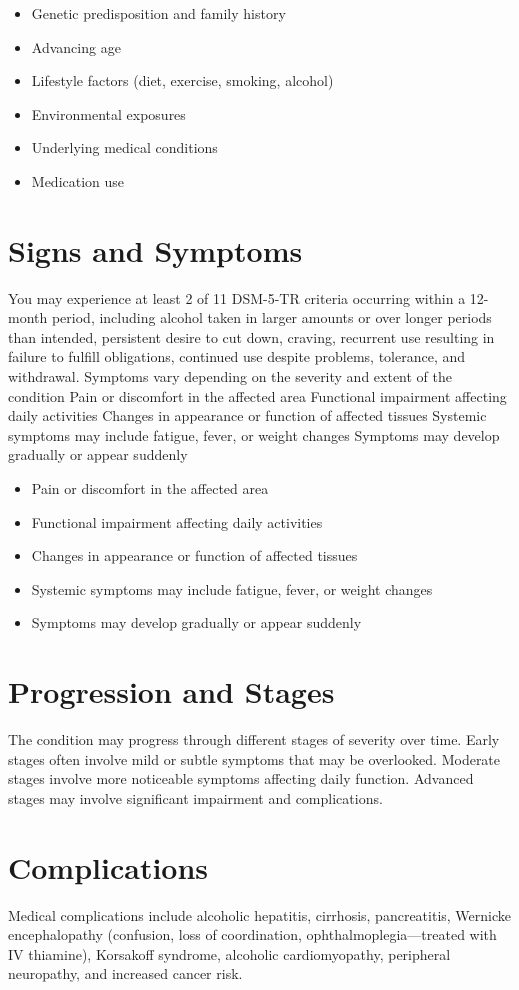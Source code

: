 \begin{itemize}[noitemsep]
  \item Genetic predisposition and family history
  \item Advancing age
  \item Lifestyle factors (diet, exercise, smoking, alcohol)
  \item Environmental exposures
  \item Underlying medical conditions
  \item Medication use
\end{itemize}
\section{Signs and Symptoms}
You may experience at least 2 of 11 DSM-5-TR criteria occurring within a 12-month period, including alcohol taken in larger amounts or over longer periods than intended, persistent desire to cut down, craving, recurrent use resulting in failure to fulfill obligations, continued use despite problems, tolerance, and withdrawal. Symptoms vary depending on the severity and extent of the condition Pain or discomfort in the affected area Functional impairment affecting daily activities Changes in appearance or function of affected tissues Systemic symptoms may include fatigue, fever, or weight changes Symptoms may develop gradually or appear suddenly

\begin{itemize}[noitemsep]
  \item Pain or discomfort in the affected area
  \item Functional impairment affecting daily activities
  \item Changes in appearance or function of affected tissues
  \item Systemic symptoms may include fatigue, fever, or weight changes
  \item Symptoms may develop gradually or appear suddenly
\end{itemize}
\section{Progression and Stages}
The condition may progress through different stages of severity over time. Early stages often involve mild or subtle symptoms that may be overlooked. Moderate stages involve more noticeable symptoms affecting daily function. Advanced stages may involve significant impairment and complications.
\section{Complications}
Medical complications include alcoholic hepatitis, cirrhosis, pancreatitis, Wernicke encephalopathy (confusion, loss of coordination, ophthalmoplegia---treated with IV thiamine), Korsakoff syndrome, alcoholic cardiomyopathy, peripheral neuropathy, and increased cancer risk.

